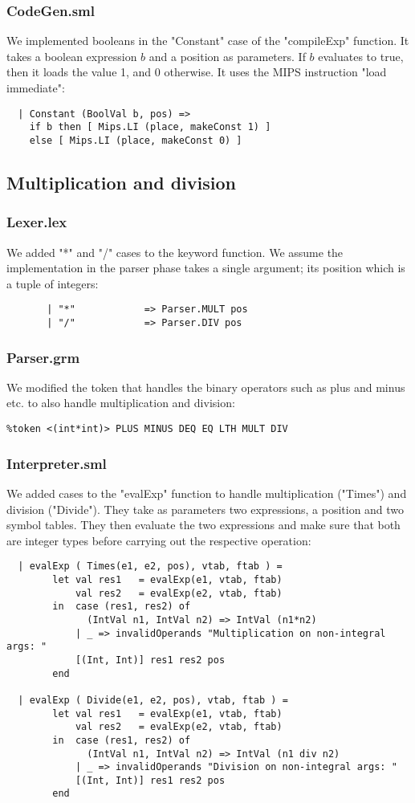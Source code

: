 \documentclass[12pt]{article}
\begin{document}
\subsubsection{CodeGen.sml}
We implemented booleans in the "Constant" case of the "compileExp" function. It takes a boolean expression \(b\) and a position as parameters. If \(b\) evaluates to true, then it loads the value 1, and 0 otherwise. It uses the MIPS instruction "load immediate": 
\begin{verbatim}
  | Constant (BoolVal b, pos) =>
    if b then [ Mips.LI (place, makeConst 1) ]
    else [ Mips.LI (place, makeConst 0) ]
\end{verbatim}
\subsection{Multiplication and division}
\subsubsection{Lexer.lex}
We added "*" and "/" cases to the keyword function. We assume the implementation in the parser phase takes a single argument; its position which is a tuple of integers:
\begin{verbatim}
       | "*"            => Parser.MULT pos
       | "/"            => Parser.DIV pos
\end{verbatim}
\subsubsection{Parser.grm}
We modified the token that handles the binary operators such as plus and minus etc. to also handle multiplication and division: 
\begin{verbatim}
%token <(int*int)> PLUS MINUS DEQ EQ LTH MULT DIV 
\end{verbatim}
\subsubsection{Interpreter.sml}
We added cases to the "evalExp" function to handle multiplication ("Times") and division ("Divide"). They take as parameters two expressions, a position and two symbol tables. They then evaluate the two expressions and make sure that both are integer types before carrying out the respective operation: 
\begin{verbatim}
  | evalExp ( Times(e1, e2, pos), vtab, ftab ) =
        let val res1   = evalExp(e1, vtab, ftab)
            val res2   = evalExp(e2, vtab, ftab)
        in  case (res1, res2) of
              (IntVal n1, IntVal n2) => IntVal (n1*n2)
            | _ => invalidOperands "Multiplication on non-integral args: " 
            [(Int, Int)] res1 res2 pos
        end

  | evalExp ( Divide(e1, e2, pos), vtab, ftab ) = 
        let val res1   = evalExp(e1, vtab, ftab)
            val res2   = evalExp(e2, vtab, ftab)
        in  case (res1, res2) of
              (IntVal n1, IntVal n2) => IntVal (n1 div n2)
            | _ => invalidOperands "Division on non-integral args: " 
            [(Int, Int)] res1 res2 pos
        end
\end{verbatim}
\end{document}
